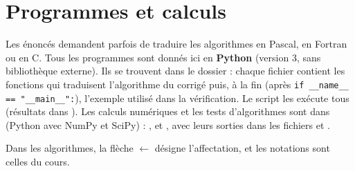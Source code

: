 \section{Programmes et calculs}

Les énoncés demandent parfois de traduire les algorithmes en Pascal, en Fortran
ou en C. Tous les programmes sont donnés ici en \textbf{Python} (version 3,
sans bibliothèque externe). Ils se trouvent dans le dossier
 : chaque fichier contient les fonctions
qui traduisent l'algorithme du corrigé puis, à la fin (après
\texttt{if \_\_name\_\_ == "\_\_main\_\_":}), l'exemple utilisé dans la
vérification. Le script  les exécute tous (résultats dans
). Les calculs numériques et les
tests d'algorithmes sont dans  (Python avec
NumPy et SciPy) : ,  et
, avec leurs sorties dans les fichiers
 et .

Dans les algorithmes, la flèche $\leftarrow$ désigne l'affectation, et les
notations sont celles du cours.
